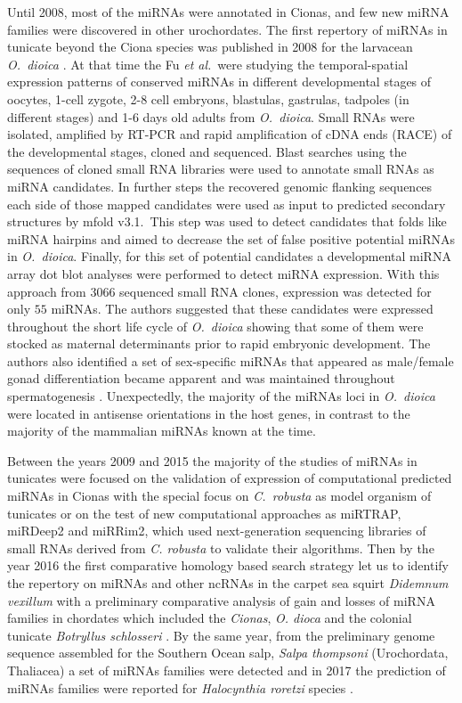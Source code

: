 \documentclass[graybox]{svmult}
\begin{document}
Until 2008, most of the miRNAs were annotated in Cionas, and few new miRNA 
families were discovered in other urochordates. 
The first repertory of miRNAs in tunicate beyond the Ciona
species was published in 2008 for the larvacean \textit{O.\ dioica}
\citep{Fu:08}. At that time the Fu \emph{et al.}\ were studying the
temporal-spatial expression patterns of conserved miRNAs in different
developmental stages of oocytes, 1-cell zygote, 2-8 cell embryons,
blastulas, gastrulas, tadpoles (in different stages) and 1-6 days old adults 
from \textit{O.\ dioica}. Small RNAs were isolated, amplified by
RT-PCR and rapid amplification of cDNA ends (RACE) of the developmental
stages, cloned and sequenced. Blast searches using the sequences of cloned
small RNA libraries were used to annotate small RNAs as miRNA
candidates. In further steps the recovered genomic flanking sequences each
side of those mapped candidates were used as input to predicted secondary
structures by mfold v3.1.\ This step was used to detect candidates that
folds like miRNA hairpins and aimed to decrease the set of false positive
potential miRNAs in \textit{O.\ dioica}. Finally, for this set of potential
candidates a developmental miRNA array dot blot analyses were performed to
detect miRNA expression. With this approach from $3066$ sequenced small RNA
clones, expression was detected for only $55$ miRNAs.  The authors
suggested that these candidates were expressed throughout the short life
cycle of \textit{O.\ dioica} showing that some of them were stocked as
maternal determinants prior to rapid embryonic development. The authors
also identified a set of sex-specific miRNAs that appeared as male/female
gonad differentiation became apparent and was maintained throughout
spermatogenesis \citep{Fu:08}. Unexpectedly, the majority of the miRNAs
loci in \textit{O.\ dioica} were located in antisense orientations in the
host genes, in contrast to the majority of the mammalian miRNAs known at
the time.

Between the years 2009 and 2015 the majority of the studies of miRNAs in
tunicates were focused on the validation of expression of computational
predicted miRNAs in Cionas with the special focus on \textit{C.\ robusta} as
model organism of tunicates or on the test of new computational
approaches as miRTRAP, miRDeep2 and miRRim2, which used next-generation
sequencing libraries of small RNAs derived from \textit{C. robusta} to
validate their algorithms.  Then by the year 2016 the first comparative
homology based search strategy let us to identify the repertory on miRNAs
and other ncRNAs in the carpet sea squirt \textit{Didemnum vexillum} with a
preliminary comparative analysis of gain and losses of miRNA families in
chordates which included the \textit{Cionas}, \textit{O. dioca} and the
colonial tunicate \textit{Botryllus schlosseri}
\citep{Velandia-Huerto2016}. By the same year, from the preliminary genome
sequence assembled for the Southern Ocean salp, \textit{Salpa thompsoni}
(Urochordata, Thaliacea) a set of miRNAs families were detected
\citep{Jue2016} and in 2017 the prediction of miRNAs families were reported
for \textit{Halocynthia roretzi} species \citep{Wang2017}.
\end{document}
